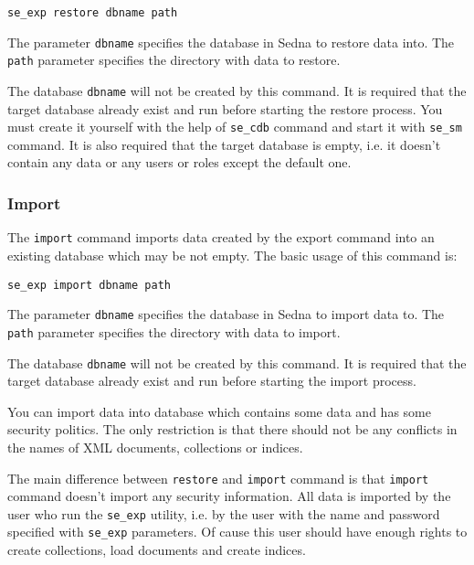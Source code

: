 \documentclass[a4paper,12pt]{article}
\begin{document}
\begin{verbatim}
se_exp restore dbname path
\end{verbatim}  

The parameter \verb!dbname! specifies the database in Sedna to restore data into. The \verb!path!
parameter specifies the directory with data to restore. 

The database \verb!dbname! will not be created by this command. It is required that the target database 
already exist and run before starting the restore process. You must create it yourself with the help
of \verb!se_cdb! command and start it with \verb!se_sm! command. It is also required that the target 
database is empty, i.e. it doesn't contain any data or any users or roles except the default one.




\subsubsection*{Import}

The \verb!import! command imports data created by the export command into an existing database
which may be not empty. The basic usage of this command is:

\begin{verbatim}
se_exp import dbname path
\end{verbatim}  

The parameter \verb!dbname! specifies the database in Sedna to import data to. The \verb!path!
parameter specifies the directory with data to import. 

The database \verb!dbname! will not be created by this command. It is required that the target database 
already exist and run before starting the import process. 

You can import data into database which contains some data and has some security politics. The only
restriction is that there should not be any conflicts in the names of XML documents, collections or
indices. 

The main difference between \verb!restore! and \verb!import! command is that \verb!import! command 
doesn't import any security information. All data is imported by the user who run the \verb!se_exp! 
utility, i.e. by the user with the name and password specified with \verb!se_exp! parameters. Of cause 
this user should have enough rights to create collections, load documents and create indices.
\end{document}
